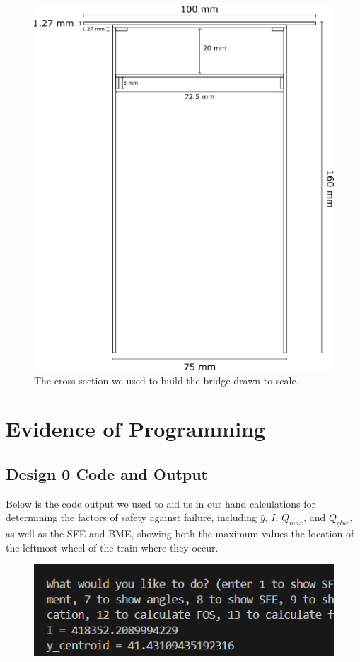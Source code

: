 \documentclass[11pt]{article}
\begin{document}
\begin{figure}[H]
    \centering
    \includegraphics[width=0.8\linewidth]{rect238.png}
    \caption{The cross-section we used to build the bridge drawn to scale. }
\end{figure}


\section{Evidence of Programming}
\subsection{Design 0 Code and Output}
Below is the code output we used to aid us in our hand calculations for determining the factors of safety against failure, including $\bar{y}$, $I$, $Q_{max}$, and $Q_{glue}$, as well as the SFE and BME, showing both the maximum values the location of the leftmost wheel of the train where they occur. 
\begin{figure}[H]
    \centering
    \includegraphics[scale = 0.7]{images/Code DO 1.png}
\end{figure}
\end{document}
